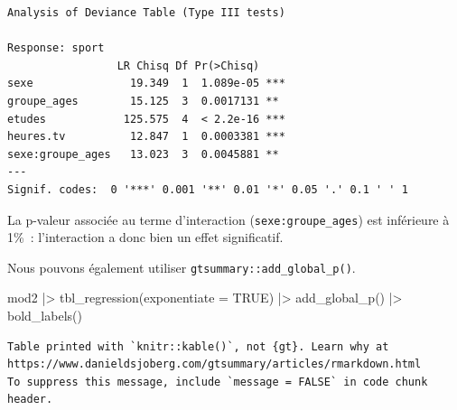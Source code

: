 \documentclass[
  letterpaper,
  DIV=11,
  numbers=noendperiod,
  oneside]{scrreprt}
\newenvironment{Shaded}{\begin{snugshade}}{\end{snugshade}}
\newcommand{\AttributeTok}[1]{\textcolor[rgb]{0.40,0.45,0.13}{#1}}
\newcommand{\ConstantTok}[1]{\textcolor[rgb]{0.56,0.35,0.01}{#1}}
\newcommand{\FunctionTok}[1]{\textcolor[rgb]{0.28,0.35,0.67}{#1}}
\newcommand{\NormalTok}[1]{\textcolor[rgb]{0.00,0.23,0.31}{#1}}
\newcommand{\SpecialCharTok}[1]{\textcolor[rgb]{0.37,0.37,0.37}{#1}}
\begin{document}
\begin{verbatim}
Analysis of Deviance Table (Type III tests)

Response: sport
                 LR Chisq Df Pr(>Chisq)    
sexe               19.349  1  1.089e-05 ***
groupe_ages        15.125  3  0.0017131 ** 
etudes            125.575  4  < 2.2e-16 ***
heures.tv          12.847  1  0.0003381 ***
sexe:groupe_ages   13.023  3  0.0045881 ** 
---
Signif. codes:  0 '***' 0.001 '**' 0.01 '*' 0.05 '.' 0.1 ' ' 1
\end{verbatim}

La p-valeur associée au terme d'interaction (\texttt{sexe:groupe\_ages})
est inférieure à 1\%~: l'interaction a donc bien un effet significatif.

Nous pouvons également utiliser \texttt{gtsummary::add\_global\_p()}.

\begin{Shaded}
\begin{Highlighting}[]
\NormalTok{mod2 }\SpecialCharTok{|\textgreater{}} 
  \FunctionTok{tbl\_regression}\NormalTok{(}\AttributeTok{exponentiate =} \ConstantTok{TRUE}\NormalTok{) }\SpecialCharTok{|\textgreater{}} 
  \FunctionTok{add\_global\_p}\NormalTok{() }\SpecialCharTok{|\textgreater{}} 
  \FunctionTok{bold\_labels}\NormalTok{()}
\end{Highlighting}
\end{Shaded}

\begin{verbatim}
Table printed with `knitr::kable()`, not {gt}. Learn why at
https://www.danieldsjoberg.com/gtsummary/articles/rmarkdown.html
To suppress this message, include `message = FALSE` in code chunk header.
\end{verbatim}
\end{document}
